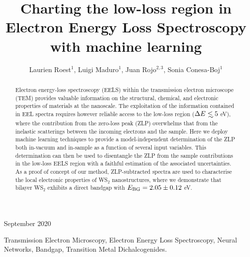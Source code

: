\documentclass[11pt]{iopart}
\def\lsim{\mathrel{\rlap{\lower4pt\hbox{\hskip1pt$\sim$}}
    \raise1pt\hbox{$<$}}}
\begin{document}

\title[Charting Electron Energy Loss Spectroscopy with machine learning]{Charting the low-loss region in Electron Energy Loss Spectroscopy with machine learning}

\author{Laurien Roest$^{1}$,
  Luigi Maduro$^{1}$,
  Juan Rojo$^{2,3}$, Sonia Conesa-Boj$^{1}$}
\address{$^{1}$Kavli Institute of Nanoscience, Delft University of Technology, 2628CJ Delft, The
  Netherlands\\
$^{2}$Nikhef Theory Group, Science Park 105, 1098 XG Amsterdam, The
  Netherlands \\$^{3}$Department of Physics and Astronomy, VUA,
  1081 HV Amsterdam, The Netherlands}

\vspace{10pt}
\begin{indented}
\item[]September 2020
\end{indented}



\begin{abstract}
  Electron energy-loss spectroscopy (EELS) within the
  transmission electron microscope (TEM) provides valuable information on the structural, chemical, and electronic properties of materials at the nanoscale.
%
%
The exploitation of the information contained in EEL spectra requires
however reliable
access to the
low-loss region ($\Delta E\lsim 5$ eV),
where the contribution from the zero-loss peak (ZLP) overwhelms
that from
the inelastic scatterings between the incoming electrons and the sample.
%
Here we deploy machine learning techniques
to provide a model-independent determination of the ZLP
both in-vacuum and in-sample as a function of several input variables.
%
This determination can then be used to disentangle
the ZLP from the sample contributions in the low-loss EELS
region
with a faithful estimation of the associated uncertainties.
%
As a proof of concept of our  method, ZLP-subtracted
spectra are used to characterise the local electronic properties of
WS$_2$ nanostructures, where we demonstrate that bilayer WS$_2$ exhibits a direct bandgap
with $E_{\rm BG}= 2.05 \pm 0.12$ eV.
\end{abstract}

 {\small Transmission Electron Microscopy,
Electron Energy Loss Spectroscopy, Neural Networks, Bandgap, Transition
Metal Dichalcogenides.}\\
\end{document}
